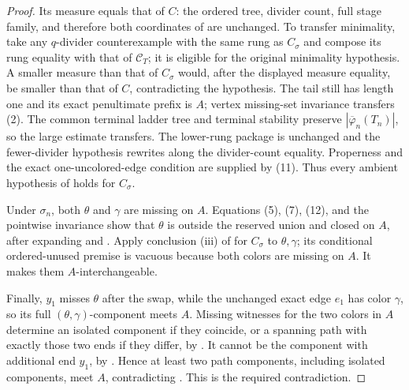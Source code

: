 \begin{proof}
Its measure equals that of $C$: the ordered tree, divider count, full
stage family, and therefore both coordinates of
 are unchanged.  To transfer
minimality, take any $q$-divider counterexample with the same rung as
$C_\sigma$ and compose its rung equality with that of $\mathcal C_T$;
it is eligible for the original minimality hypothesis.  A smaller
measure than that of $C_\sigma$ would, after the displayed measure
equality, be smaller than that of $C$, contradicting the hypothesis.
The tail still has length one and its exact penultimate prefix is $A$;
vertex missing-set invariance transfers (2).  The common terminal ladder
tree and terminal stability preserve $|\overline\varphi_n(T_n)|$, so
the large estimate transfers.  The lower-rung package is unchanged and
the fewer-divider hypothesis rewrites along the divider-count equality.
Properness and the exact one-uncolored-edge condition are supplied by
(11).  Thus every ambient hypothesis of  holds for
$C_\sigma$.

Under $\sigma_n$, both $\theta$ and $\gamma$ are missing on $A$.
Equations (5), (7), (12), and the pointwise invariance show that
$\theta$ is outside the reserved union and closed on $A$, after
expanding  and
.  Apply conclusion (iii) of
 for $C_\sigma$ to $\theta,\gamma$; its conditional
ordered-unused premise is vacuous because both colors are missing on
$A$.  It makes them $A$-interchangeable.

Finally, $y_1$ misses $\theta$ after the swap, while the unchanged exact
edge $e_1$ has color $\gamma$, so its full
$(\theta,\gamma)$-component meets $A$.  Missing witnesses for the two
colors in $A$ determine an isolated component if they coincide, or a
spanning path with exactly those two ends if they differ, by
.  It cannot be the component
with additional end $y_1$, by
.  Hence at least two path
components, including isolated components, meet $A$, contradicting
.  This is the required contradiction.
\end{proof}
